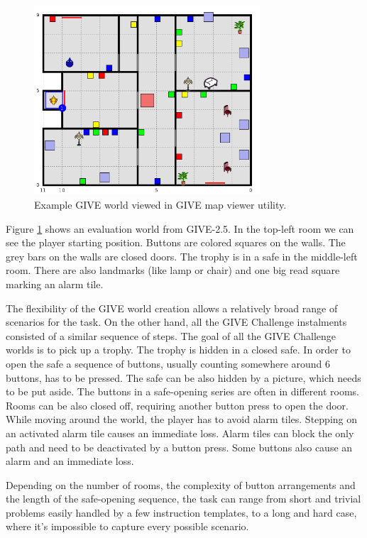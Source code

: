 \begin{figure}[!htbp]
  \centering
	\includegraphics[width=0.75\textwidth]{Images/give-evalworldexmaple}
	\caption{Example GIVE world viewed in GIVE map viewer utility.}
	\label{fig:give-evalworldexmaple}
\end{figure}

Figure \ref{fig:give-evalworldexmaple} shows an evaluation world from GIVE-2.5. In the top-left room we can see the player starting position. Buttons are colored squares on the walls. The grey bars on the walls are closed doors. The trophy is in a safe in the middle-left room. There are also landmarks (like lamp or chair) and one big read square marking an alarm tile.

The flexibility of the GIVE world creation allows a relatively broad range of scenarios for the task. On the other hand, all the GIVE Challenge instalments consisted of a similar sequence of steps. The goal of all the GIVE Challenge worlds is to pick up a trophy. The trophy is hidden in a closed safe. In order to open the safe a sequence of buttons, usually counting somewhere around 6 buttons, has to be pressed. The safe can be also hidden by a picture, which needs to be put aside. The buttons in a safe-opening series are often in different rooms. Rooms can be also closed off, requiring another button press to open the door. While moving around the world, the player has to avoid alarm tiles. Stepping on an activated alarm tile causes an immediate loss. Alarm tiles can block the only path and need to be deactivated by a button press. Some buttons also cause an alarm and an immediate loss.

Depending on the number of rooms, the complexity of button arrangements and the length of the safe-opening sequence, the task can range from short and trivial problems easily handled by a few instruction templates, to a long and hard case, where it's impossible to capture every possible scenario.

